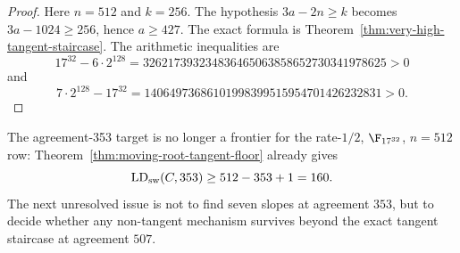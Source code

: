 \begin{proof}
Here \(n=512\) and \(k=256\).  The hypothesis
\(3a-2n\ge k\) becomes \(3a-1024\ge256\), hence \(a\ge427\).  The exact formula
is Theorem~\ref{thm:very-high-tangent-staircase}.  The arithmetic inequalities
are
\[
  17^{32}-6\cdot2^{128}
  =326217393234836465063858652730341978625>0
\]
 and
\[
  7\cdot2^{128}-17^{32}
  =14064973686101998399515954701426232831>0 .
\]
\end{proof}

\begin{remark}
The agreement-353 target is no longer a frontier for the rate-\(1/2\),
\(\F_{17^{32}}\), \(n=512\) row: Theorem~\ref{thm:moving-root-tangent-floor}
already gives
\[
  \operatorname{LD}_{\rm sw}(C,353)\ge512-353+1=160.
\]
The next unresolved issue is not to find seven slopes at agreement \(353\), but
to decide whether any non-tangent mechanism survives beyond the exact tangent
staircase at agreement \(507\).
\end{remark}
